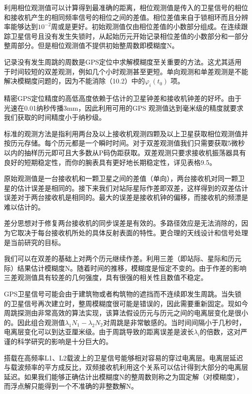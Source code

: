 利用相位观测值可以计算得到最准确的距离，相位观测值是传入的卫星信号的相位和接收机产生的相同频率信号的相位之间的差值。相位差值来自于锁相环而且分辨率能够达到$10^{-2}$周或是更好。初始观测值仅由相位差值的小数部分组成。在连续跟踪卫星信号且没有发生失锁时，从起始历元开始记录相位差值的小数部分和一部分整周部分。但是相位观测值不提供初始整周数即模糊度N。

记录没有发生周跳的周数是GPS定位中求解模糊度至关重要的方法。这尤其适用于时间较短的双差观测，例如几个小时观测甚至更短。单向观测和单差观测是不能解决模糊度问题的，因为不能消除（10.2）中的$\varphi_{i}(t_{0})$ 项。

精密GPS定位精度的高低高度依赖于估计的卫星钟差和接收机钟差的好坏。由于光速在0.01纳秒传播3mm，因此利用可用的GPS 观测值达到毫米级的精度就要求我们获取的时间精度小于纳秒级。

标准的观测方法是指利用两台及以上接收机观测四颗及以上卫星获取相位观测值并按历元存储。每个历元都是一个瞬时时间。对于双差观测值我们只需要获取5微秒以内的抽样历元即可且大多数从P码伪距获取。双差观测只要求接收机振荡器具有良好的短期稳定性，而你的腕表具有更好地长期稳定性，详见表格9.5。

原始观测值是一台接收机和一颗卫星之间的差值（单向），两台接收机对同一颗卫星的估计误差是相同的。接下来我们对站际星际作差即双差，这样得到的双差估计误差对于两台接收机是相同的。最大的误差是接收机钟的偏移，而接收机的频漂是难以估计的。

差分思想对于修复两台接收机的同步误差是有效的。多路径效应是无法消除的，因为它取决于每台接收机所处的具体反射表面的特性。更合理的天线设计和信号处理是当前研究的目标。

我们可以在双差的基础上对两个历元继续作差。利用三差（即站际、星际和历元际）结果估计模糊度N。随着时间的推移，模糊度是恒定不变的。由于作差的影响三差观测值具有较差的几何强度，具有很强的相关性且数值不稳定。	

GPS卫星信号可能会由于建筑物或者构筑物的遮挡而不连续即发生周跳。当失锁的卫星信号再次建立时，整周模糊度很可能是错误的，因此需要重新固定。现如今周跳探测由非常高效的算法实现，该算法假设历元与历元之间的电离层变化是很小的。因此组合观测值$\lambda_{1}N_{1}-\lambda_{2}N_{2}$对周跳是非常敏感的。当时间间隔小于几秒时，电离层变化可以到达亚厘米级。由于周跳导致的距离误差是波长$\lambda_{i}$的倍数，这对严谨的科学研究的影响是十分巨大的。

搭载在高频率L1、L2载波上的卫星信号能够相对容易的穿过电离层。电离层延迟与载波频率的平方成反比，双频接收机利用这个关系可以估计得到大部分的电离层延迟。如果我们能够正确估计出模糊度N的整周数则称之为固定解（对模糊度），而浮点解只能得到一个不准确的非整数解N。


